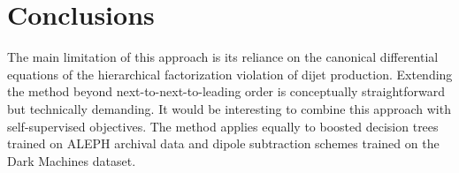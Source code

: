 \section{Conclusions}\label{sec:conclusions}

The main limitation of this approach is its reliance on the canonical
differential equations of the hierarchical factorization violation of
dijet production. Extending the method beyond next-to-next-to-leading
order is conceptually straightforward but technically demanding. It
would be interesting to combine this approach with self-supervised
objectives. The method applies equally to boosted decision trees trained
on ALEPH archival data and dipole subtraction schemes trained on the
Dark Machines dataset.

